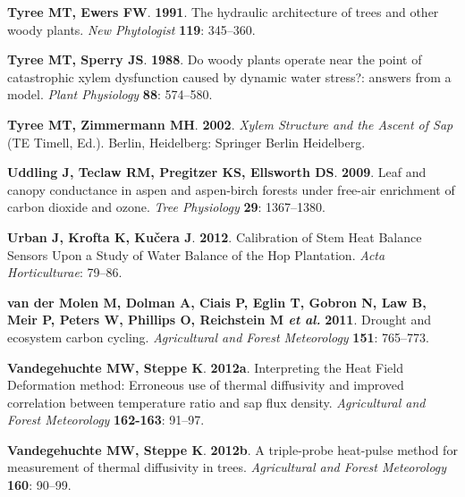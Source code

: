 \documentclass[11pt,twoside]{reedthesis}
\begin{document}
\hypertarget{ref-TyreeEwers1991}{}
\textbf{\textnormal{Tyree MT}, \textnormal{Ewers FW}}. \textbf{1991}.
The hydraulic architecture of trees and other woody plants. \emph{New
Phytologist} \textbf{119}: 345--360.

\hypertarget{ref-tyree_woody_1988}{}
\textbf{\textnormal{Tyree MT}, \textnormal{Sperry JS}}. \textbf{1988}.
Do woody plants operate near the point of catastrophic xylem dysfunction
caused by dynamic water stress?: answers from a model. \emph{Plant
Physiology} \textbf{88}: 574--580.

\hypertarget{ref-tyree_xylem_2002}{}
\textbf{\textnormal{Tyree MT}, \textnormal{Zimmermann MH}}.
\textbf{2002}. \emph{Xylem Structure and the Ascent of Sap} (TE Timell,
Ed.). Berlin, Heidelberg: Springer Berlin Heidelberg.

\hypertarget{ref-Uddling2009}{}
\textbf{\textnormal{Uddling J}, \textnormal{Teclaw RM},
\textnormal{Pregitzer KS}, \textnormal{Ellsworth DS}}. \textbf{2009}.
Leaf and canopy conductance in aspen and aspen-birch forests under
free-air enrichment of carbon dioxide and ozone. \emph{Tree Physiology}
\textbf{29}: 1367--1380.

\hypertarget{ref-Urban2012}{}
\textbf{\textnormal{Urban J}, \textnormal{Krofta K}, \textnormal{Kučera
J}}. \textbf{2012}. Calibration of Stem Heat Balance Sensors Upon a
Study of Water Balance of the Hop Plantation. \emph{Acta Horticulturae}:
79--86.

\hypertarget{ref-Vandermolen2011}{}
\textbf{\textnormal{van der Molen M}, \textnormal{Dolman A},
\textnormal{Ciais P}, \textnormal{Eglin T}, \textnormal{Gobron N},
\textnormal{Law B}, \textnormal{Meir P}, \textnormal{Peters W},
\textnormal{Phillips O}, \textnormal{Reichstein M} \emph{et al.}}
\textbf{2011}. Drought and ecosystem carbon cycling. \emph{Agricultural
and Forest Meteorology} \textbf{151}: 765--773.

\hypertarget{ref-Vandegehuchte2012a}{}
\textbf{\textnormal{Vandegehuchte MW}, \textnormal{Steppe K}}.
\textbf{2012a}. Interpreting the Heat Field Deformation method:
Erroneous use of thermal diffusivity and improved correlation between
temperature ratio and sap flux density. \emph{Agricultural and Forest
Meteorology} \textbf{162-163}: 91--97.

\hypertarget{ref-Vandegehuchte2012}{}
\textbf{\textnormal{Vandegehuchte MW}, \textnormal{Steppe K}}.
\textbf{2012b}. A triple-probe heat-pulse method for measurement of
thermal diffusivity in trees. \emph{Agricultural and Forest Meteorology}
\textbf{160}: 90--99.
\end{document}

